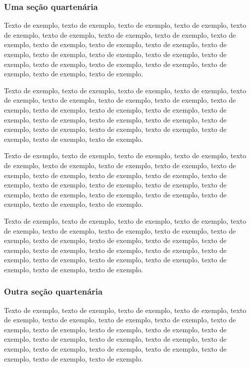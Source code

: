 \documentclass[
	12pt,				%
	oneside,			%
	a4paper,			%
	english,			%
	brazil				%
	]{abntex2ppgsi}
\begin{document}
\subsubsection{Uma seção quartenária}

Texto de exemplo, texto de exemplo, texto de exemplo, texto de exemplo, texto de exemplo, texto de exemplo, texto de exemplo, texto de exemplo, texto de exemplo, texto de exemplo, texto de exemplo, texto de exemplo, texto de exemplo, texto de exemplo, texto de exemplo, texto de exemplo, texto de exemplo, texto de exemplo, texto de exemplo, texto de exemplo, texto de exemplo, texto de exemplo, texto de exemplo.


Texto de exemplo, texto de exemplo, texto de exemplo, texto de exemplo, texto de exemplo, texto de exemplo, texto de exemplo, texto de exemplo, texto de exemplo, texto de exemplo, texto de exemplo, texto de exemplo, texto de exemplo, texto de exemplo, texto de exemplo, texto de exemplo, texto de exemplo, texto de exemplo, texto de exemplo, texto de exemplo, texto de exemplo, texto de exemplo, texto de exemplo.


Texto de exemplo, texto de exemplo, texto de exemplo, texto de exemplo, texto de exemplo, texto de exemplo, texto de exemplo, texto de exemplo, texto de exemplo, texto de exemplo, texto de exemplo, texto de exemplo, texto de exemplo, texto de exemplo, texto de exemplo, texto de exemplo, texto de exemplo, texto de exemplo, texto de exemplo, texto de exemplo, texto de exemplo, texto de exemplo, texto de exemplo.


Texto de exemplo, texto de exemplo, texto de exemplo, texto de exemplo, texto de exemplo, texto de exemplo, texto de exemplo, texto de exemplo, texto de exemplo, texto de exemplo, texto de exemplo, texto de exemplo, texto de exemplo, texto de exemplo, texto de exemplo, texto de exemplo, texto de exemplo, texto de exemplo, texto de exemplo, texto de exemplo, texto de exemplo, texto de exemplo, texto de exemplo.

\subsubsection{Outra seção quartenária}

Texto de exemplo, texto de exemplo, texto de exemplo, texto de exemplo, texto de exemplo, texto de exemplo, texto de exemplo, texto de exemplo, texto de exemplo, texto de exemplo, texto de exemplo, texto de exemplo, texto de exemplo, texto de exemplo, texto de exemplo, texto de exemplo, texto de exemplo, texto de exemplo, texto de exemplo, texto de exemplo, texto de exemplo, texto de exemplo, texto de exemplo.
\end{document}
